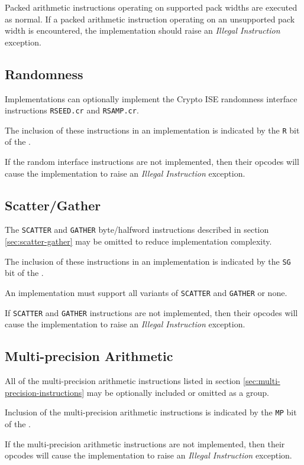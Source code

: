 Packed arithmetic instructions operating on supported pack widths are
executed as normal. If a packed arithmetic instruction operating on an
unsupported pack width is encountered, the implementation should raise an
{\em Illegal Instruction} exception.

\subsection{Randomness}

Implementations can optionally implement the Crypto ISE randomness interface
instructions {\tt RSEED.cr} and {\tt RSAMP.cr}.

The inclusion of these instructions in an implementation is indicated by the
{\tt R} bit of the .

If the random interface instructions are not implemented, then their opcodes
will cause the implementation to raise an {\em Illegal Instruction}
exception.

\subsection{Scatter/Gather}

The {\tt SCATTER} and {\tt GATHER} byte/halfword instructions described
in section \ref{sec:scatter-gather} may be omitted to reduce implementation
complexity.

The inclusion of these instructions in an implementation is indicated by the
{\tt SG} bit of the .

An implementation must support all variants of {\tt SCATTER} and {\tt GATHER}
or none.

If {\tt SCATTER} and {\tt GATHER} instructions are not implemented, then their
opcodes will cause the implementation to raise an {\em Illegal Instruction}
exception.

\subsection{Multi-precision Arithmetic}

All of the multi-precision arithmetic instructions listed in section
\ref{sec:multi-precision-instructions} may be optionally included or omitted
as a group.

Inclusion of the multi-precision arithmetic instructions is indicated by
the {\tt MP} bit of the  .

If the multi-precision arithmetic instructions are not implemented, then their
opcodes will cause the implementation to raise an {\em Illegal Instruction}
exception.

